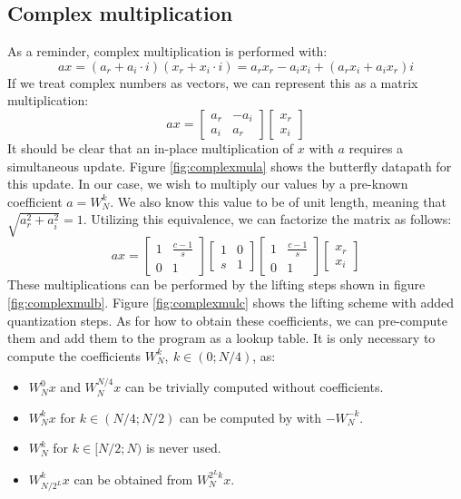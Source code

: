 \subsection{Complex multiplication}
As a reminder, complex multiplication is performed with:
\begin{equation}
    ax = (a_r + a_i \cdot i)(x_r + x_i \cdot i) = a_rx_r - a_ix_i + (a_r x_i + a_ix_r)i
\end{equation}
If we treat complex numbers as vectors, we can represent this as a matrix multiplication:
\begin{equation}
    ax =
    \begin{bmatrix}
        a_r &-a_i\\
        a_i &a_r
    \end{bmatrix}
    \begin{bmatrix}
        x_r\\
        x_i
    \end{bmatrix}
\end{equation}
It should be clear that an in-place multiplication of $x$ with $a$ requires a simultaneous update.
Figure \ref{fig:complexmula} shows the butterfly datapath for this update.
In our case, we wish to multiply our values by a pre-known coefficient $a = W_N^k$.
We also know this value to be of unit length, meaning that $\sqrt{a_r^2 + a_i^2} = 1$.
Utilizing this equivalence, we can factorize the matrix as follows:
\begin{equation}
    ax =
    \begin{bmatrix}
        1 &\frac{c-1}{s}\\
        0 &1
    \end{bmatrix}
    \begin{bmatrix}
        1 &0\\
        s &1
    \end{bmatrix}
    \begin{bmatrix}
        1 &\frac{c - 1}{s}\\
        0 &1
    \end{bmatrix}
    \begin{bmatrix}
        x_r\\
        x_i
    \end{bmatrix}
\end{equation}
These multiplications can be performed by the lifting steps shown in figure \ref{fig:complexmulb}.
Figure \ref{fig:complexmulc} shows the lifting scheme with added quantization steps.
As for how to obtain these coefficients,
we can pre-compute them and add them to the program as a lookup table.
It is only necessary to compute the coefficients $W_N^k,~k \in (0;N/4)$, as:
\begin{itemize}
    \item $W_N^0 x$ and $W_N^{N/4} x$ can be trivially computed without coefficients.
    \item $W_N^k x$ for $k \in (N/4; N/2)$ can be computed by with $-W_N^{-k}$.
    \item $W_N^k$ for $k \in [N/2;N)$ is never used.
    \item $W_{N/2^L}^k x$ can be obtained from $W_N^{2^L k} x$.
\end{itemize}

